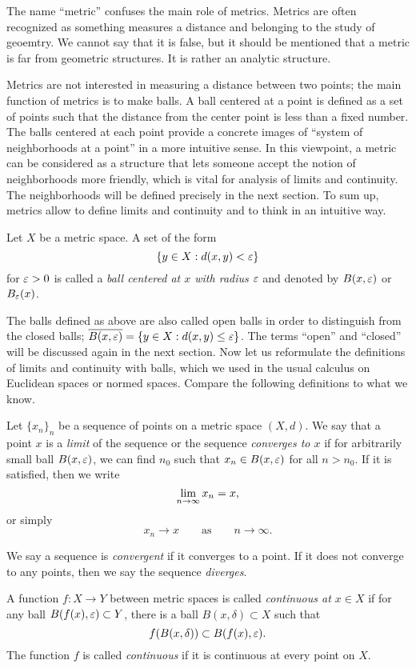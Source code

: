 The name ``metric'' confuses the main role of metrics.
Metrics are often recognized as something measures a distance and belonging to the study of geoemtry.
We cannot say that it is false, but it should be mentioned that a metric is far from geometric structures.
It is rather an analytic structure.

Metrics are not interested in measuring a distance between two points; the main function of metrics is to make balls.
A ball centered at a point is defined as a set of points such that the distance from the center point is less than a fixed number.
The balls centered at each point provide a concrete images of ``system of neighborhoods at a point'' in a more intuitive sense.
In this viewpoint, a metric can be considered as a structure that lets someone accept the notion of neighborhoods more friendly, which is vital for analysis of limits and continuity.
The neighborhoods will be defined precisely in the next section.
To sum up, metrics allow to define limits and continuity and to think in an intuitive way.

\begin{defn}
Let $X$ be a metric space.
A set of the form 
\[\{y\in X:d(x,y)<\varepsilon\}\]
for $\varepsilon>0$ is called a \emph{ball centered at $x$ with radius $\varepsilon$} and denoted by $B(x,\varepsilon)$ or $B_\varepsilon(x)$.
\end{defn}

The balls defined as above are also called open balls in order to distinguish from the closed balls; $\overline{B(x,\varepsilon)}=\{y\in X:d(x,y)\le\varepsilon\}$.
The terms ``open'' and ``closed'' will be discussed again in the next section.
Now let us reformulate the definitions of limits and continuity with balls, which we used in the usual calculus on Euclidean spaces or normed spaces.
Compare the following definitions to what we know.

\begin{defn}
Let $\{x_n\}_n$ be a sequence of points on a metric space $(X,d)$.
We say that a point $x$ is a \emph{limit} of the sequence or the sequence \emph{converges to $x$} if for arbitrarily small ball $B(x,\varepsilon)$, we can find $n_0$ such that $x_n\in B(x,\varepsilon)$ for all $n>n_0$.
If it is satisfied, then we write
\[\lim_{n\to\oo}x_n=x,\]
or simply
\[x_n\to x\qquad\text{as}\qquad n\to\infty.\]

We say a sequence is \emph{convergent} if it converges to a point.
If it does not converge to any points, then we say the sequence \emph{diverges}.
\end{defn}
\begin{defn}
A function $f:X\to Y$ between metric spaces is called \emph{continuous at $x\in X$} if for any ball $B(f(x),\varepsilon)\subset Y$, there is a ball $B(x,\delta)\subset X$ such that
\[f(B(x,\delta))\subset B(f(x),\varepsilon).\]
The function $f$ is called \emph{continuous} if it is continuous at every point on $X$.
\end{defn}

